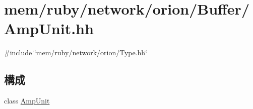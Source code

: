 \hypertarget{AmpUnit_8hh}{
\section{mem/ruby/network/orion/Buffer/AmpUnit.hh}
\label{AmpUnit_8hh}
}
{\ttfamily \#include \char`\"{}mem/ruby/network/orion/Type.hh\char`\"{}}\par
\subsection*{構成}
\begin{DoxyCompactItemize}
\item 
class \hyperlink{classAmpUnit}{AmpUnit}
\end{DoxyCompactItemize}
